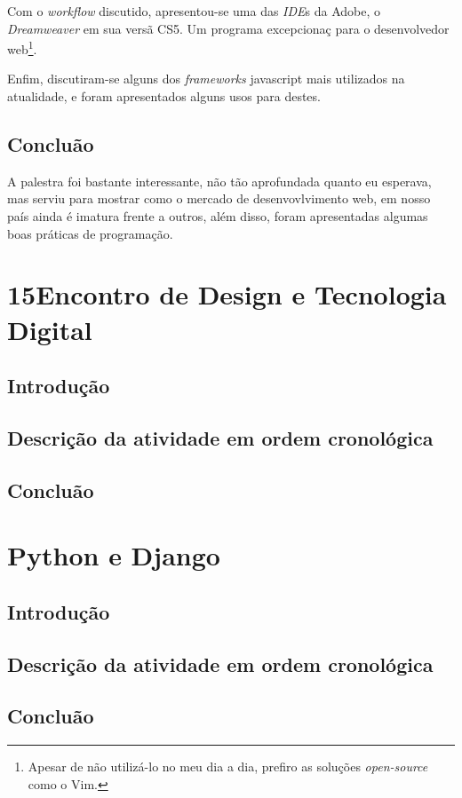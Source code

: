 \documentclass[a4paper]{report}
\begin{document}
        Com o \emph{workflow} discutido, apresentou-se uma das \emph{IDE}s da
        Adobe, o \emph{Dreamweaver} em sua vers\~{a} CS5. Um programa excepcionaç
        para o desenvolvedor web\footnote{Apesar de n\~{a}o utiliz\'{a}-lo no meu
        dia a dia, prefiro as solu\c{c}\~{o}es \emph{open-source} como o Vim.}.

        Enfim, discutiram-se alguns dos \emph{frameworks} javascript mais
        utilizados na atualidade, e foram apresentados alguns usos para destes.

        \section{Conclu\~{a}o}

        A palestra foi bastante interessante, n\~{a}o t\~{a}o aprofundada quanto
        eu esperava, mas serviu para mostrar como o mercado de desenvovlvimento
        web, em nosso pa\'{i}s ainda \'{e} imatura frente a outros, al\'{e}m
        disso, foram apresentadas algumas boas pr\'{a}ticas de programa\c{c}\~{a}o.

    \chapter[15\textordmasculine EDTED]{15\textordmasculine Encontro de Design e
    Tecnologia Digital}

        \section{Introdu\c{c}\~{a}o}

        \section[Descri\c{c}\~{a}o atividade]{Descri\c{c}\~{a}o da atividade em
        ordem cronol\'{o}gica}

        \section{Conclu\~{a}o}

    \chapter[Python \& Django]{Python e Django}

        \section{Introdu\c{c}\~{a}o}

        \section[Descri\c{c}\~{a}o atividade]{Descri\c{c}\~{a}o da atividade em
        ordem cronol\'{o}gica}

        \section{Conclu\~{a}o}
\end{document}
